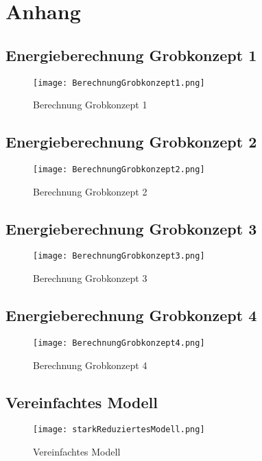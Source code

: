 \section{Anhang} \label{sec:anhang}

\subsection{Energieberechnung Grobkonzept 1} \label{subsec:grobkonzept1}
\begin{figure} [H]
	\centering
	\texttt{[image: BerechnungGrobkonzept1.png]}
	\caption{Berechnung Grobkonzept 1}
	\label{fig:BerechnungGrobkonzept1}
\end{figure}

\subsection{Energieberechnung Grobkonzept 2} \label{subsec:grobkonzept2}
\begin{figure} [H]
	\centering
	\texttt{[image: BerechnungGrobkonzept2.png]}
	\caption{Berechnung Grobkonzept 2}
	\label{fig:BerechnungGrobkonzept2}
\end{figure}

\subsection{Energieberechnung Grobkonzept 3} \label{subsec:grobkonzept3}
\begin{figure} [H]
	\centering
	\texttt{[image: BerechnungGrobkonzept3.png]}
	\caption{Berechnung Grobkonzept 3}
	\label{fig:BerechnungGrobkonzept3}
\end{figure}

\subsection{Energieberechnung Grobkonzept 4} \label{subsec:grobkonzept4}
\begin{figure} [H]
	\centering
	\texttt{[image: BerechnungGrobkonzept4.png]}
	\caption{Berechnung Grobkonzept 4}
	\label{fig:BerechnungGrobkonzept4}
\end{figure}

\subsection{Vereinfachtes Modell} \label{subsec:vereinfachtesModel}
\begin{figure} [H]
	\centering
	\texttt{[image: starkReduziertesModell.png]}
	\caption{Vereinfachtes Modell}
	\label{fig:VereinfachtesModel}
\end{figure}